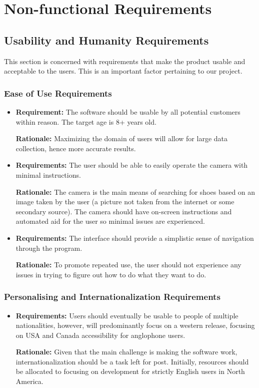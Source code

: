 \documentclass[12pt, titlepage]{article}
\begin{document}
\section{Non-functional Requirements}

\subsection{Usability and Humanity Requirements}
This section is concerned with requirements that make the product usable and acceptable to the users. This is an important factor pertaining to our project.

\subsubsection{Ease of Use Requirements}
\begin{itemize}
    \item \textbf{Requirement:} The software should be usable by all potential customers within reason. The target age is 8+ years old.
    
    \textbf{Rationale:} Maximizing the domain of users will allow for large data collection, hence more accurate results.
    
    \item \textbf{Requirements:} The user should be able to easily operate the camera with minimal instructions.
    
    \textbf{Rationale:} The camera is the main means of searching for shoes based on an image taken by the user (a picture not taken from the internet or some secondary source). The camera should have on-screen instructions and automated aid for the user so minimal issues are experienced.
    
    \item \textbf{Requirements:} The interface should provide a simplistic sense of navigation through the program.
    
    \textbf{Rationale:} To promote repeated use, the user should not experience any issues in trying to figure out how to do what they want to do.
\end{itemize}

\subsubsection{Personalising and Internationalization Requirements}
\begin{itemize}
    \item\textbf{Requirements:} Users should eventually be usable to people of multiple nationalities, however, will predominantly focus on a western release, focusing on USA and Canada accessibility for anglophone users.
    
    \textbf{Rationale:} Given that the main challenge is making the software work, internationalization should be a task left for post. Initially, resources should be allocated to focusing on development for strictly English users in North America.
\end{itemize}
\end{document}
